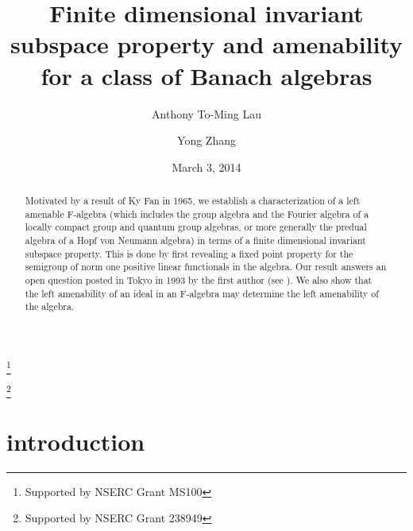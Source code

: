\documentclass{tran-l}
\numberwithin{equation}{section}
\theoremstyle{definition}
\theoremstyle{remark}
\begin{document}
 \title[invariance subspace property and amenability]{Finite dimensional invariant subspace property and amenability for a class of Banach algebras}

\author[A. T.-M. Lau]{Anthony To-Ming Lau}
\address{Department of Mathematical and Statistical sciences\\
           University of Alberta\\
           Edmonton, Alberta\\
           T6G 2G1 Canada}
\thanks{Supported by NSERC Grant MS100}

\author[Y. Zhang]{ Yong Zhang}
\address{Department of Mathematics\\
           University of Manitoba\\
           Winnipeg, Manitoba\\
           R3T 2N2 Canada}
\thanks{Supported by NSERC Grant 238949}

\date{March 3, 2014}



\begin{abstract}
Motivated by a result of Ky Fan in 1965, we establish a characterization of a left amenable F-algebra (which includes the group algebra and the Fourier algebra of a locally compact group and quantum group algebras, or more generally the predual algebra of a Hopf von Neumann algebra) in terms of a finite dimensional invariant subspace property. This is done by first revealing a fixed point property for the semigroup of norm one positive linear functionals in the algebra. Our result answers an open question posted in Tokyo in 1993 by the first author (see \cite[Problem 5]{Lau_Tokyo}). We also show that the left amenability of an ideal in an F-algebra may determine the left amenability of the algebra.
\end{abstract}

\maketitle

\section{introduction}
\end{document}
